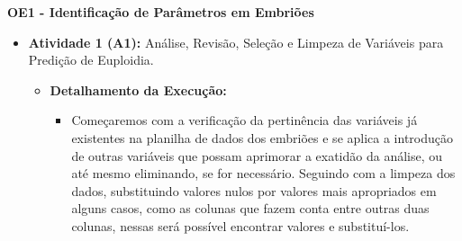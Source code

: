\begin{itemize}
  \textbf{OE1 - Identificação de Parâmetros em Embriões}
  \begin{itemize}
      \item \textbf{Atividade 1 (A1):} Análise, Revisão, Seleção e Limpeza de Variáveis para Predição de Euploidia.
      \begin{itemize}
        \item \textbf{Detalhamento da Execução:} 
        \begin{itemize}
          \item Começaremos com a verificação da pertinência das variáveis já existentes na planilha de dados dos embriões e se aplica a introdução de outras variáveis que possam aprimorar a exatidão da análise, ou até mesmo eliminando, se for necessário. Seguindo com a limpeza dos dados, substituindo valores nulos por valores mais apropriados em alguns casos, como as colunas que fazem conta entre outras duas colunas, nessas será possível encontrar valores e substituí-los.
        \end{itemize}


\end{itemize}
\end{itemize}
\end{itemize}
